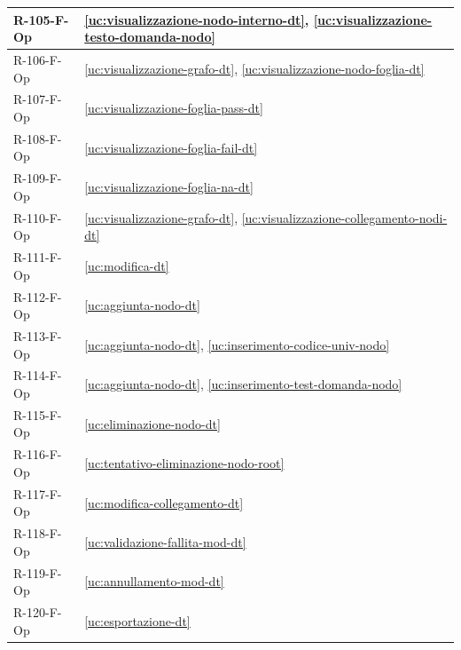 ﻿\documentclass[a4paper,12pt]{article}
\begin{document}
{\begin{longtable}{|
      >{\centering\arraybackslash}p{}|
      >{\centering\arraybackslash}p{}|
      }
        R-105-F-Op & \ref{uc:visualizzazione-nodo-interno-dt}, \ref{uc:visualizzazione-testo-domanda-nodo} \\ \hline
        R-106-F-Op & \ref{uc:visualizzazione-grafo-dt}, \ref{uc:visualizzazione-nodo-foglia-dt} \\ \hline
        R-107-F-Op & \ref{uc:visualizzazione-foglia-pass-dt} \\ \hline
        R-108-F-Op & \ref{uc:visualizzazione-foglia-fail-dt} \\ \hline
        R-109-F-Op & \ref{uc:visualizzazione-foglia-na-dt} \\ \hline
        R-110-F-Op & \ref{uc:visualizzazione-grafo-dt}, \ref{uc:visualizzazione-collegamento-nodi-dt} \\ \hline
        R-111-F-Op & \ref{uc:modifica-dt} \\ \hline
        R-112-F-Op & \ref{uc:aggiunta-nodo-dt} \\ \hline
        R-113-F-Op & \ref{uc:aggiunta-nodo-dt}, \ref{uc:inserimento-codice-univ-nodo} \\ \hline
        R-114-F-Op & \ref{uc:aggiunta-nodo-dt}, \ref{uc:inserimento-test-domanda-nodo} \\ \hline
        R-115-F-Op & \ref{uc:eliminazione-nodo-dt} \\ \hline
        R-116-F-Op & \ref{uc:tentativo-eliminazione-nodo-root} \\ \hline
        R-117-F-Op & \ref{uc:modifica-collegamento-dt} \\ \hline
        R-118-F-Op & \ref{uc:validazione-fallita-mod-dt} \\ \hline
        R-119-F-Op & \ref{uc:annullamento-mod-dt} \\ \hline
        R-120-F-Op & \ref{uc:esportazione-dt} \\ \hline
        
  \end{longtable}



}
\end{document}
